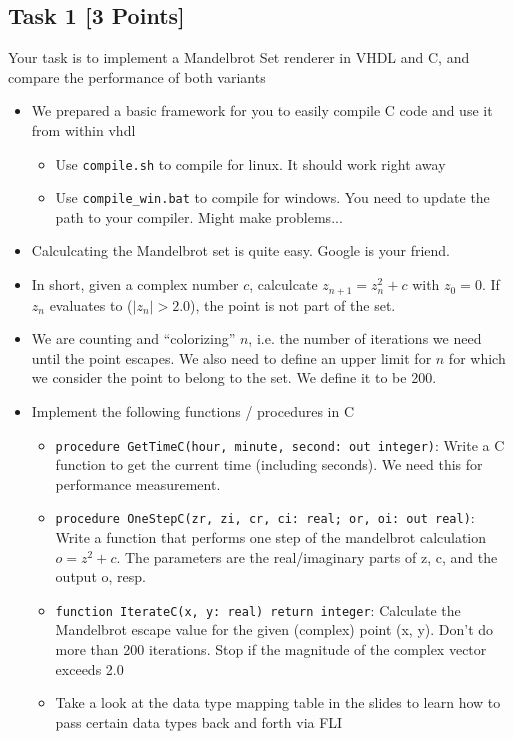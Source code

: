 \documentclass[12pt,epsf,makeidx,oneside]{book}
\begin{document}
\subsection{Task 1 [3 Points]}
  Your task is to implement a Mandelbrot Set renderer in VHDL and C, and compare the performance of both variants
  \begin{itemize}[noitemsep]
    \item We prepared a basic framework for you to easily compile C code and use it from within vhdl
    \begin{itemize}[noitemsep]
      \item Use {\tt compile.sh} to compile for linux. It should work right away
      \item Use {\tt compile\_win.bat} to compile for windows. You need to update the path to your compiler. Might make problems...
    \end{itemize}
    \item Calculcating the Mandelbrot set is quite easy. Google is your friend.
    \item In short, given a complex number $c$, calculcate $z_{n+1}=z_n^2+c$ with $z_0=0$. If $z_n$ evaluates to ($|z_n|>2.0$), the point is not part of the set. 
    \item We are counting and ``colorizing'' $n$, i.e. the number of iterations we need until the point escapes. We also need to define an upper limit for $n$
          for which we consider the point to belong to the set. We define it to be 200.
    \item Implement the following functions / procedures in C
    \begin{itemize}[noitemsep]
      \item {\tt procedure GetTimeC(hour, minute, second: out integer)}: Write a C function to get the current time (including seconds). We need this for performance measurement.
      \item {\tt procedure OneStepC(zr, zi, cr, ci: real; or, oi: out real)}: Write a function that performs one step of the mandelbrot calculation $o=z^2+c$. The parameters are the real/imaginary parts of z, c, and the output o, resp.
      \item {\tt function IterateC(x, y: real) return integer}: Calculate the Mandelbrot escape value for the given (complex) point (x, y). Don't do more than 200 iterations. 
            Stop if the magnitude of the complex vector exceeds 2.0
      \item Take a look at the data type mapping table in the slides to learn how to pass certain data types back and forth via FLI

\end{itemize}
\end{itemize}
\end{document}
